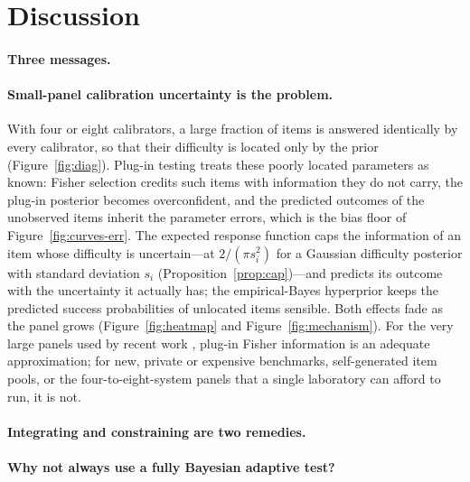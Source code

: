 \section{Discussion}
\label{sec:discussion}

\paragraph{Three messages.} \DiscussionSummary

\paragraph{Small-panel calibration uncertainty is the problem.} With four or eight
calibrators, a large fraction of items is answered identically by every calibrator, so
that their difficulty is located only by the prior (Figure~\ref{fig:diag}).
Plug-in testing treats these poorly located parameters as known: Fisher selection
credits such items with information they do not carry, the plug-in posterior becomes
overconfident, and the predicted outcomes of the unobserved items inherit the parameter
errors, which is the bias floor of Figure~\ref{fig:curves-err}. The expected response
function caps the information of an item whose difficulty is uncertain---at $2/(\pi s_i^2)$
for a Gaussian difficulty posterior with standard deviation $s_i$
(Proposition~\ref{prop:cap})---and predicts its outcome with the uncertainty it actually has; the empirical-Bayes
hyperprior keeps the predicted success probabilities of unlocated items sensible. Both
effects fade as the panel grows (Figure~\ref{fig:heatmap} and
Figure~\ref{fig:mechanism}). For the very large panels used by recent work
\citep{li2026atlas}, plug-in Fisher information is an adequate approximation; for new,
private or expensive benchmarks, self-generated item pools, or the four-to-eight-system
panels that a single laboratory can afford to run, it is not.

\paragraph{Integrating and constraining are two remedies.} \DiscussionRemedies

\paragraph{Why not always use a fully Bayesian adaptive test?} \DiscussionWhyNotFB

